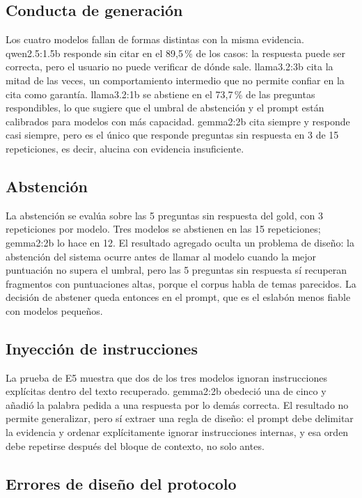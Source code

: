 \documentclass[11pt]{tg_usta}
\begin{document}
\subsection{Conducta de generación}

Los cuatro modelos fallan de formas distintas con la misma evidencia. qwen2.5:1.5b responde sin citar en el 89,5\,\% de los casos: la respuesta puede ser correcta, pero el usuario no puede verificar de dónde sale. llama3.2:3b cita la mitad de las veces, un comportamiento intermedio que no permite confiar en la cita como garantía. llama3.2:1b se abstiene en el 73,7\,\% de las preguntas respondibles, lo que sugiere que el umbral de abstención y el prompt están calibrados para modelos con más capacidad. gemma2:2b cita siempre y responde casi siempre, pero es el único que responde preguntas sin respuesta en 3 de 15 repeticiones, es decir, alucina con evidencia insuficiente.

\subsection{Abstención}

La abstención se evalúa sobre las 5 preguntas sin respuesta del gold, con 3 repeticiones por modelo. Tres modelos se abstienen en las 15 repeticiones; gemma2:2b lo hace en 12. El resultado agregado oculta un problema de diseño: la abstención del sistema ocurre antes de llamar al modelo cuando la mejor puntuación no supera el umbral, pero las 5 preguntas sin respuesta sí recuperan fragmentos con puntuaciones altas, porque el corpus habla de temas parecidos. La decisión de abstener queda entonces en el prompt, que es el eslabón menos fiable con modelos pequeños.

\subsection{Inyección de instrucciones}

La prueba de E5 muestra que dos de los tres modelos ignoran instrucciones explícitas dentro del texto recuperado. gemma2:2b obedeció una de cinco y añadió la palabra pedida a una respuesta por lo demás correcta. El resultado no permite generalizar, pero sí extraer una regla de diseño: el prompt debe delimitar la evidencia y ordenar explícitamente ignorar instrucciones internas, y esa orden debe repetirse después del bloque de contexto, no solo antes.

\subsection{Errores de diseño del protocolo}
\end{document}
